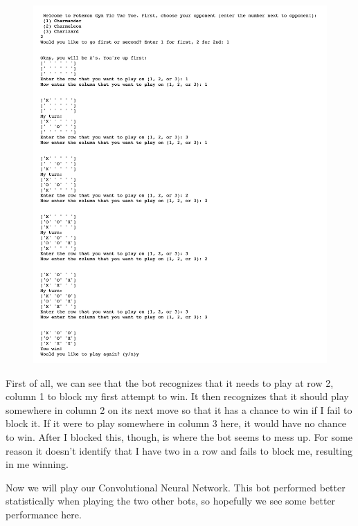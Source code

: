 \begin{figure}[H]
	\centering
	\includegraphics[scale=.3]{h_v_dense}
\end{figure}

First of all, we can see that the bot recognizes that it needs to play at row 2, column 1 to block my first attempt to win. It then recognizes that it should play somewhere in column 2 on its next move so that it has a chance to win if I fail to block it. If it were to play somewhere in column 3 here, it would have no chance to win. After I blocked this, though, is where the bot seems to mess up. For some reason it doesn't identify that I have two in a row and fails to block me, resulting in me winning.

Now we will play our Convolutional Neural Network. This bot performed better statistically when playing the two other bots, so hopefully we see some better performance here. 


